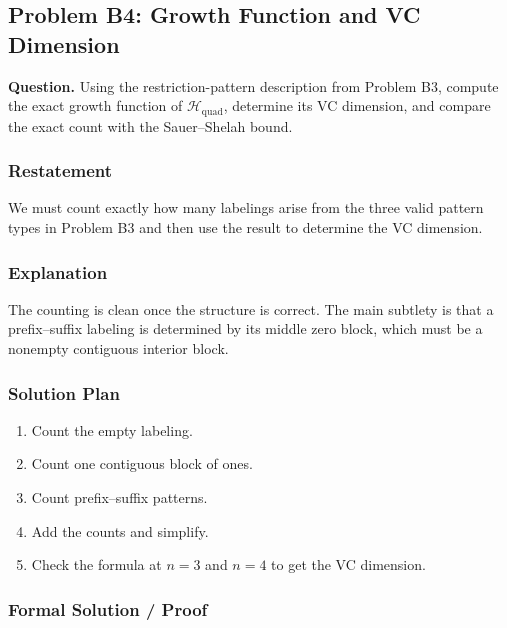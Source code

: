 \documentclass{article}
\newcommand{\classB}{\mathcal{H}_{\mathrm{quad}}}
\begin{document}
\subsection{Problem B4: Growth Function and VC Dimension}

\textbf{Question.}
\newline
Using the restriction-pattern description from Problem B3, compute the exact
growth function of \(\classB\), determine its VC dimension, and compare the
exact count with the Sauer--Shelah bound.

\begin{solutionbox}

\subsubsection{Restatement}

We must count exactly how many labelings arise from the three valid pattern
types in Problem B3 and then use the result to determine the VC dimension.

\subsubsection{Explanation}

The counting is clean once the structure is correct. The main subtlety is that a
prefix--suffix labeling is determined by its middle zero block, which must be a
nonempty contiguous interior block.

\subsubsection{Solution Plan}

\begin{enumerate}[leftmargin=2.5em]
    \item Count the empty labeling.
    \item Count one contiguous block of ones.
    \item Count prefix--suffix patterns.
    \item Add the counts and simplify.
    \item Check the formula at \(n=3\) and \(n=4\) to get the VC dimension.
\end{enumerate}

\subsubsection{Formal Solution / Proof}


\end{solutionbox}
\end{document}
